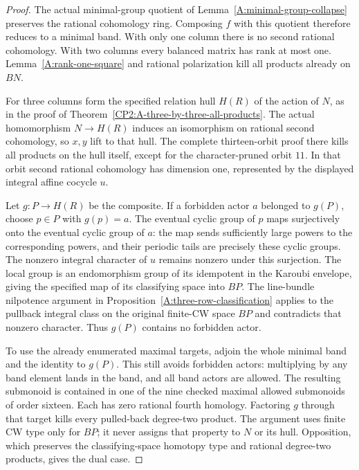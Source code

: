 \begin{proof}
The actual minimal-group quotient of
Lemma~\ref{A:minimal-group-collapse} preserves the rational
cohomology ring. Composing $f$ with this quotient therefore
reduces to a minimal band. With only one column there is no
second rational cohomology. With two columns every balanced
matrix has rank at most one. Lemma~\ref{A:rank-one-square}
and rational polarization kill all products already on $BN$.

For three columns form the specified relation hull $H(R)$
of the action of $N$, as in the proof of
Theorem~\ref{CP2:A-three-by-three-all-products}. The actual
homomorphism $N\to H(R)$ induces an isomorphism on rational
second cohomology, so $x,y$ lift to that hull. The complete
thirteen-orbit proof there kills all products on the hull
itself, except for the character-pruned orbit $11$.
In that orbit second rational cohomology has dimension one,
represented by the displayed integral affine cocycle $u$.

Let $g:P\to H(R)$ be the composite. If a forbidden actor
$a$ belonged to $g(P)$, choose $p\in P$ with $g(p)=a$.
The eventual cyclic group of $p$ maps surjectively onto the
eventual cyclic group of $a$: the map sends sufficiently
large powers to the corresponding powers, and their periodic
tails are precisely these cyclic groups. The nonzero integral
character of $u$ remains nonzero under this surjection.
The local group is an endomorphism group of its idempotent
in the Karoubi envelope, giving the specified map of its
classifying space into $BP$. The line-bundle nilpotence
argument in Proposition~\ref{A:three-row-classification}
applies to the pullback integral class on the original
finite-CW space $BP$ and contradicts that nonzero character.
Thus $g(P)$ contains no forbidden actor.

To use the already enumerated maximal targets, adjoin the
whole minimal band and the identity to $g(P)$. This still
avoids forbidden actors: multiplying by any band element
lands in the band, and all band actors are allowed.
The resulting submonoid is contained in one of the nine
checked maximal allowed submonoids of order sixteen.
Each has zero rational fourth homology. Factoring $g$
through that target kills every pulled-back degree-two
product. The argument uses finite CW type only for $BP$;
it never assigns that property to $N$ or its hull.
Opposition, which preserves the classifying-space homotopy
type and rational degree-two products, gives the dual case.
\end{proof}

